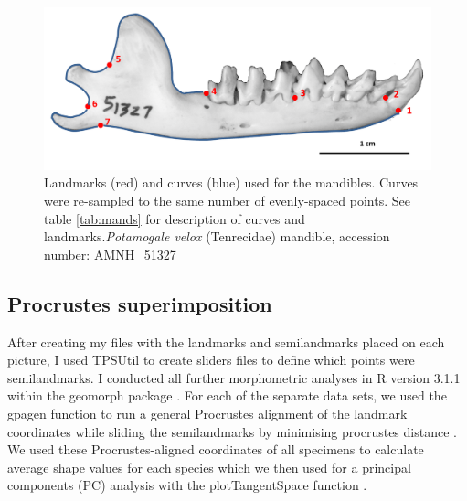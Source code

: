 	\newpage %

\begin{figure}[!htb]
	\centering
	\includegraphics[width=1\linewidth]{Methods/figures/AMNH_51327_landmarksdiagram.png}
	\caption[Mandibles: landmarks]
			{Landmarks (red) and curves (blue) used for the mandibles. Curves were re-sampled to the same number of evenly-spaced points. See table \ref{tab:mands} for description of curves and landmarks.\textit{Potamogale velox} (Tenrecidae) mandible, accession number: AMNH\_51327}
	\label{fig:mands_landmarks}
\end{figure}

\begin{table}[!htb]			
	\centering
	\caption[Mandibles: landmarks]
		{Descriptions of the landmarks (points) and curves (semilandmarks) for the mandibles in lateral (buccal) view (figure \ref{fig:mands_landmarks}}
	
	\label{tab:mands} 
\end{table}

\subsection{Procrustes superimposition}
\label{sect:procrustes}

	After creating my files with the landmarks and semilandmarks placed on each picture, I used TPSUtil \citep{Rohlf2012} to create sliders files \citep{Zelditch2012} to define which points were semilandmarks. I conducted all further morphometric analyses in R version 3.1.1 \citep{Team2014} within the geomorph package \citep{Adams2013}.
	For each of the separate data sets, we used the gpagen function to run a general Procrustes alignment \citep{Rohlf1993} of the landmark coordinates while sliding the semilandmarks by minimising procrustes distance \citep{Bookstein1997}.
	We used these Procrustes-aligned coordinates of all specimens to calculate average shape values for each species which we then used for a principal components (PC) analysis with the plotTangentSpace function \citep{Adams2013}. 


